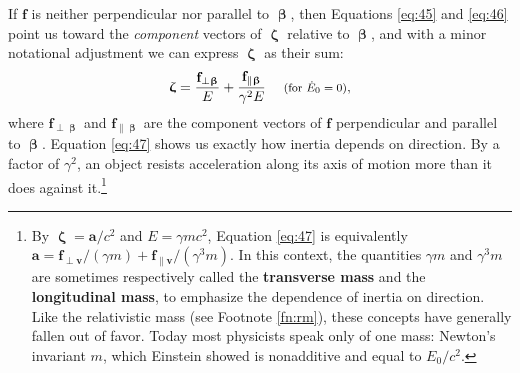 \documentclass[12pt]{article}
\renewcommand{\vv}[1]{\mathbf{#1}}
\newcommand{\vvbeta}{\bm{\upbeta}}
\newcommand{\vvzeta}{\bm{\upzeta}}
\begin{document}
If $\vv f$ is neither perpendicular nor parallel to $\vvbeta$, then Equations \ref{eq:45} and \ref{eq:46} point us toward the \emph{component} vectors of $\vvzeta$ relative to $\vvbeta$, and with a minor notational adjustment we can express $\vvzeta$ as their sum:
\begin{equation}\label{eq:47}
\vvzeta = \frac{\vv f_{\perp \vvbeta}}{E} + \frac{\vv f_{\parallel \vvbeta}}{\gamma^2 E} \quad \textrm{\footnotesize{ (for $\dot{E}_0 = 0$)}},
\end{equation}
where $\vv f_{\perp \vvbeta}$ and $\vv f_{\parallel \vvbeta}$ are the component vectors of $\vv f$ perpendicular and parallel to $\vvbeta$. Equation \ref{eq:47} shows us exactly how inertia depends on direction. By a factor of $\gamma^2$, an object resists acceleration along its axis of motion more than it does against it.\footnote{By $\vvzeta = \vv a / c^2$ and $E = \gamma mc^2$, Equation \ref{eq:47} is equivalently $\vv a = \vv f_{\perp \vv v} / (\gamma m) + \vv f_{\parallel \vv v} / (\gamma^3 m)$. In this context, the quantities $\gamma m$ and $\gamma^3 m$ are sometimes respectively called the \textbf{transverse mass} and the \textbf{longitudinal mass}, to emphasize the dependence of inertia on direction. Like the relativistic mass (see Footnote \ref{fn:rm}), these concepts have generally fallen out of favor. Today most physicists speak only of one mass: Newton's invariant $m$, which Einstein showed is nonadditive and equal to $E_0 / c^2$.}
\end{document}
